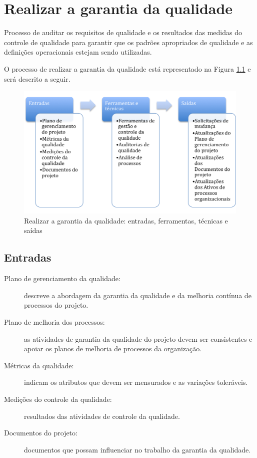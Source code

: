 \chapter{Realizar a garantia da qualidade}

Processo de auditar os requisitos de qualidade e os resultados das medidas do controle de qualidade para garantir que os padrões apropriados de qualidade e as definições operacionais estejam sendo utilizadas.

O processo de realizar a garantia da qualidade está representado na Figura \ref{fig:qualidade:gar:efts} e será descrito a seguir.

\begin{figure}[!h]
	\centering
	\includegraphics[scale=0.5]{Figuras/qualidade_efts_realizar.png}
	\caption{Realizar a garantia da qualidade: entradas, ferramentas, técnicas e saídas}
	\label{fig:qualidade:gar:efts}
\end{figure}

\section{Entradas}

\begin{description}

	\item[Plano de gerenciamento da qualidade:] descreve a abordagem da garantia da qualidade e da melhoria contínua de processos do projeto.
	
	\item[Plano de melhoria dos processos:] as atividades de garantia da qualidade do projeto devem ser consistentes e apoiar os planos de melhoria de processos da organização.
	
	\item[Métricas da qualidade:] indicam os atributos que devem ser mensurados e as variações toleráveis.
	
	\item[Medições do controle da qualidade:] resultados das atividades de controle da qualidade.
	
	\item[Documentos do projeto:] documentos que possam influenciar no trabalho da garantia da qualidade.
		
\end{description}

